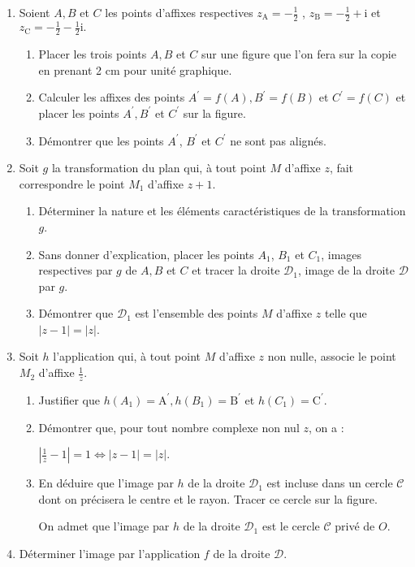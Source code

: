 \begin{enumerate}
     \item
     Soient $A, B$ et $C$ les points d'affixes respectives
     $z_{\text{A}}=-\frac{1}{2}$ , $ z_{\text{B}}=-\frac{1}{2}+\text{i} $ et $   z_{\text{C}}=-\frac{1}{2}-\frac{1}{2} \text{i}.$
     \begin{enumerate}[label=\alph*.]
          \item
          Placer les trois points $A, B$ et $C$ sur une figure que l'on fera sur la copie en prenant 2 cm pour unité graphique.
          \item
          Calculer les affixes des points $A^{\prime} = f\left(A\right),  B^{\prime} = f\left(B\right)$ et $C^{\prime} = f\left(C\right)$ et placer les points $A^{\prime}, B^{\prime}$ et $C^{\prime}$ sur la figure.
          \item
          Démontrer que les points $A^{\prime}$, $B^{\prime}$ et $C^{\prime}$ ne sont pas alignés.
     \end{enumerate}
     \item
     Soit $g$ la transformation du plan qui, à tout point $M$ d'affixe $z$, fait correspondre le point $M_{1}$ d'affixe $z + 1$.
     \begin{enumerate}[label=\alph*.]
          \item
          Déterminer la nature et les éléments caractéristiques de la transformation $g$.
          \item
          Sans donner d'explication, placer les points $A_{1}$, $B_{1}$ et $C_{1}$, images respectives par $g$ de $A, B$ et $C$ et tracer la droite $\mathscr D_{1}$, image de la droite $\mathscr D$ par $g$.
          \item
          Démontrer que $\mathscr D_{1}$ est l'ensemble des points $M$ d'affixe $z$ telle que $|z-1| = |z|$.
     \end{enumerate}
     \item
     Soit $h$ l'application qui, à tout point $M$ d'affixe $z$ non nulle, associe le point $M_{2}$ d'affixe $\frac{1}{z}$.
     \begin{enumerate}[label=\alph*.]
          \item
          Justifier que $h\left(A_{1}\right) = \text{A}^{\prime}, h\left(B_{1}\right) = \text{B}^{\prime}$ et $h \left(C_{1}\right) = \text{C}^{\prime}$.
          \item
          Démontrer que, pour tout nombre complexe non nul $z$, on a :
          \par
          $  \left| \frac{1}{z}-1\right|= 1 \Leftrightarrow   |z-1| = |z|.$
          \item
          En déduire que l'image par $h$ de la droite $\mathscr D_{1}$ est incluse dans un cercle $\mathscr C$ dont on précisera le centre et le rayon. Tracer ce cercle sur la figure.
          \par
          On admet que l'image par $h$ de la droite $\mathscr D_{1}$ est le cercle $\mathscr C$ privé de $O$.
     \end{enumerate}
     \item
     Déterminer l'image par l'application $f$ de la droite $\mathscr D$.
\end{enumerate}
